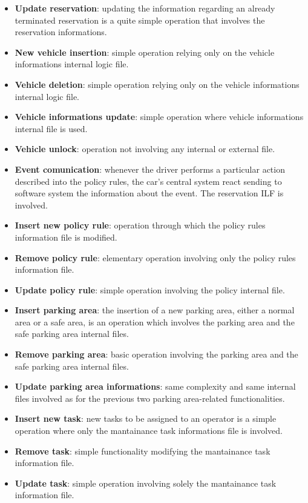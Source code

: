 \begin{itemize}
	\item \textbf{Update reservation}: updating the information regarding an already terminated reservation is a quite simple operation that involves the reservation informations.

	\item \textbf{New vehicle insertion}: simple operation relying only on the vehicle informations internal logic file.

	\item \textbf{Vehicle deletion}: simple operation relying only on the vehicle informations internal logic file.

	\item \textbf{Vehicle informations update}: simple operation where vehicle informations internal file is used.

	\item \textbf{Vehicle unlock}: operation not involving any internal or external file.

	\item \textbf{Event comunication}: whenever the driver performs a particular action described into the policy rules, the car's central system react sending to software system the information about the event. The reservation ILF is involved.

	\item \textbf{Insert new policy rule}: operation through which the policy rules information file is modified.

	\item \textbf{Remove policy rule}: elementary operation involving only the policy rules information file.

	\item \textbf{Update policy rule}: simple operation involving the policy internal file.

	\item \textbf{Insert parking area}: the insertion of a new parking area, either a normal area or a safe area, is an operation which involves the parking area and the safe parking area internal files.

	\item \textbf{Remove parking area}: basic operation involving the parking area and the safe parking area internal files.

	\item \textbf{Update parking area informations}: same complexity and same internal files involved as for the previous two parking area-related functionalities.

	\item \textbf{Insert new task}: new tasks to be assigned to an operator is a simple operation where only the mantainance task informations file is involved.

	\item \textbf{Remove task}: simple functionality modifying the mantainance task information file.

	\item \textbf{Update task}: simple operation involving solely the mantainance task information file.
\end{itemize}

